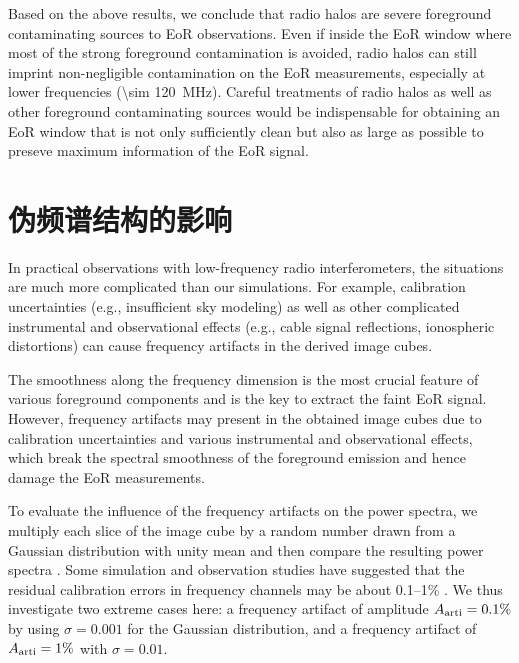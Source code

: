 Based on the above results, we conclude that radio halos are severe
foreground contaminating sources to EoR observations.
Even if inside the EoR window where most of the strong foreground
contamination is avoided, radio halos can still imprint
non-negligible contamination on the EoR measurements, especially at
lower frequencies (\SI{\sim 120}{\MHz}).
Careful treatments of radio halos as well as other foreground contaminating
sources would be indispensable for obtaining an EoR window that is not only
sufficiently clean but also as large as possible to preseve maximum
information of the EoR signal.


\section{伪频谱结构的影响}
\label{sec:freq-artifacts}

In practical observations with low-frequency radio interferometers, the
situations are much more complicated than our simulations.
For example, calibration uncertainties (e.g., insufficient sky modeling)
as well as other complicated instrumental and observational effects
(e.g., cable signal reflections, ionospheric distortions) can cause
frequency artifacts in the derived image cubes.

The smoothness along the frequency dimension is the most crucial feature
of various foreground components and is the key to extract the faint EoR
signal.
However, frequency artifacts may present in the obtained image cubes due
to calibration uncertainties and various instrumental and observational
effects, which break the spectral smoothness of the foreground emission
and hence damage the EoR measurements.

To evaluate the influence of the frequency artifacts on the power
spectra, we multiply each slice of the image cube by a random number
drawn from a Gaussian distribution with unity mean and then compare
the resulting power spectra \cite{chapman2016}.
Some simulation and observation studies have suggested that the residual
calibration errors in frequency channels may be about \numrange{0.1}{1}\%
\cite{barry2016,beardsley2016,ewallWice2017}.
We thus investigate two extreme cases here:
a frequency artifact of amplitude $A_{\mathrm{arti}} = 0.1\%$ by
using $\sigma = 0.001$ for the Gaussian distribution,
and a frequency artifact of $A_{\mathrm{arti}} = 1\%$ with $\sigma = 0.01$.

